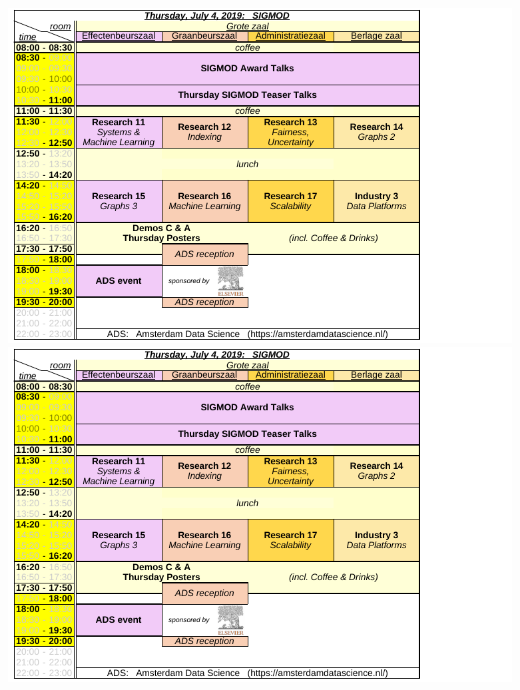\ifodd\value{page}
\includegraphics[angle=270,width=\textwidth]{schedule/p5.pdf}%
\else
\includegraphics[angle=90,width=\textwidth]{schedule/p5.pdf}%
\fi

\newpage

